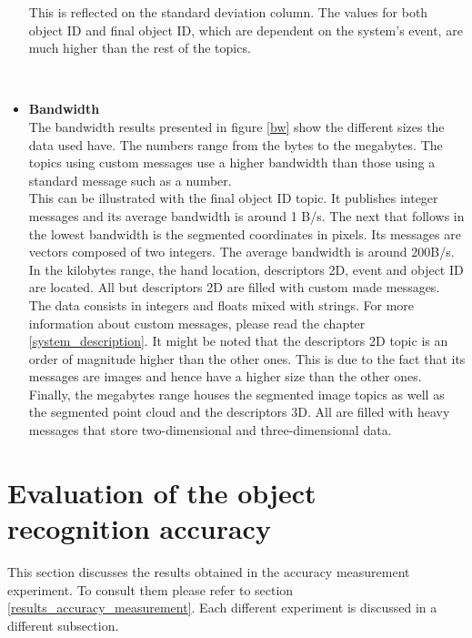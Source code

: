 \begin{itemize}
			This is reflected on the standard deviation column. 
			The values for both object ID and final object ID, which are dependent on the system's event, are much higher than the rest of the topics. 

			\\

			\item{\textbf{Bandwidth}}\\

			The  bandwidth results presented in figure \ref{bw} show the different sizes the data used have. 
			The numbers range from the bytes to the megabytes. 
			The topics using custom messages use a higher bandwidth than those using a standard message such as a number. 
			\\

			This can be illustrated with the final object ID topic. 
			It publishes integer messages and its average bandwidth is around 1 B/s. 
			The next that follows in the lowest bandwidth is the segmented coordinates in pixels. 
			Its messages are vectors composed of two integers. 
			The average bandwidth is around 200B/s. 
			\\

			In the kilobytes range, the hand location, descriptors 2D, event and object ID are located. 
			All but descriptors 2D are filled with custom made messages. 
			The data consists in integers and floats mixed with strings. 
			For more information about custom messages, please read the chapter \ref{system_description}.
			It might be noted that the descriptors 2D topic is an order of magnitude higher than the other ones. 
			This is due to the fact that its messages are images and hence have a higher size than the other ones. 
			\\

			Finally, the megabytes range houses the segmented image topics as well as the segmented point cloud and the descriptors 3D. 
			All are filled with heavy messages that store two-dimensional and three-dimensional data. 
		\end{itemize}

\section{Evaluation of the object recognition accuracy}
	This section discusses the results obtained in the accuracy measurement experiment. 
	To consult them please refer to section \ref{results_accuracy_measurement}.
	Each different experiment is discussed in a different subsection.


